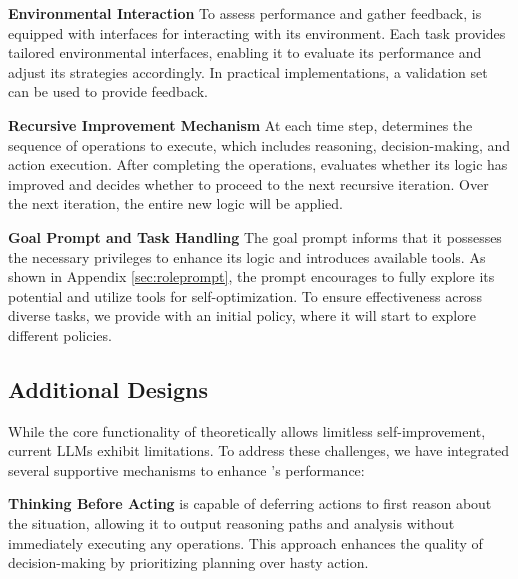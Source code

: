 \noindent\textbf{Environmental Interaction} \quad
To assess performance and gather feedback, \framework is equipped with interfaces for interacting with its environment. Each task provides tailored environmental interfaces, enabling it to evaluate its performance and adjust its strategies accordingly. 
In practical implementations, a validation set can be used to provide feedback.

\noindent\textbf{Recursive Improvement Mechanism} \quad
At each time step, \framework determines the sequence of operations to execute, which includes reasoning, decision-making, and action execution. After completing the operations, \framework evaluates whether its logic has improved and decides whether to proceed to the next recursive iteration. 
Over the next iteration, the entire new logic will be applied.

\noindent\textbf{Goal Prompt and Task Handling} \quad
The goal prompt informs \framework that it possesses the necessary privileges to enhance its logic and introduces available tools. As shown in Appendix \ref{sec:roleprompt}, the prompt encourages \framework to fully explore its potential and utilize tools for self-optimization. To ensure effectiveness across diverse tasks, we provide \framework with an initial policy, where it will start to explore different policies.

\subsection{Additional Designs}
\label{sec:addi}
While the core functionality of \framework theoretically allows limitless self-improvement, current LLMs exhibit limitations. To address these challenges, we have integrated several supportive mechanisms to enhance \framework’s performance:





\noindent\textbf{Thinking Before Acting} \quad
\framework is capable of deferring actions to first reason about the situation, allowing it to output reasoning paths and analysis without immediately executing any operations. This approach enhances the quality of decision-making by prioritizing planning over hasty action.

